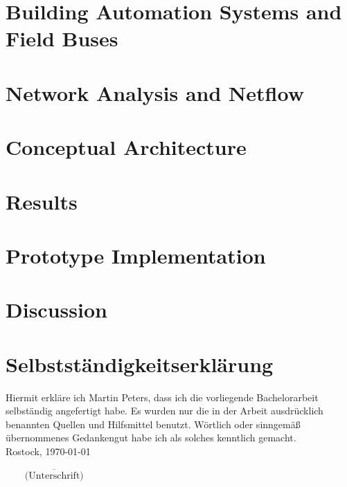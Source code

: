 \documentclass[12pt, a4paper, titlepage]{book}
\newcommand{\thedate}{\today}
\begin{document}
	\chapter{Building Automation Systems and Field Buses}
	\label{sec:background:bas}
	
	
	\chapter{Network Analysis and Netflow}
	\label{sec:background:network}
	
	
	\chapter{Conceptual Architecture}
	\label{sec:concept}
	
	
	\chapter{Results}
	
	\chapter{Prototype Implementation}
	
	\chapter{Discussion}
	
	
	\newpage
	
	\chapter*{Selbstständigkeitserklärung}
	Hiermit erkläre ich Martin Peters, dass ich die vorliegende Bachelorarbeit selbständig angefertigt habe. Es wurden nur die in der Arbeit ausdrücklich benannten Quellen und Hilfsmittel benutzt. Wörtlich oder sinngemäß übernommenes Gedankengut habe ich als solches kenntlich gemacht.
	\\[64pt]
	\noindent Rostock, \thedate
	\begin{flushright}
		$\overline{~~~~~~~~~\mbox{(Unterschrift)}~~~~~~~~~}$
	\end{flushright}
	
\end{document}
